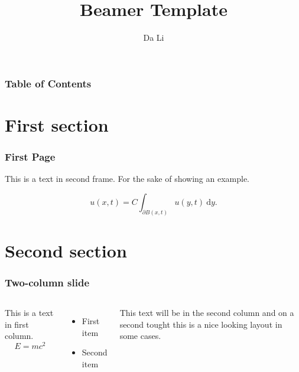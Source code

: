\documentclass[10pt]{beamer}
\title{Beamer Template}
\author{Da Li}
\institute{
  Department of Mathematics and Statistics\\
  University of Calgary
}
\date{}
\begin{document}
\frame{\titlepage}


\begin{frame}
\frametitle{Table of Contents}
\tableofcontents
\end{frame}


\section{First section}

\begin{frame}
\frametitle{First Page}
This is a text in second frame. For the sake of showing an example.

$$u(x,t) = C\int_{\partial B(x,t)} u(y,t) \ \mathrm{d}y.$$
\end{frame}

\section{Second section}

\begin{frame}
\frametitle{Two-column slide}

\begin{columns}

This is a text in first column.
$$E=mc^2$$
\begin{itemize}
\item First item
\item Second item
\end{itemize}

This text will be in the second column
and on a second tought this is a nice looking
layout in some cases.
\end{columns}
\end{frame}
\end{document}
